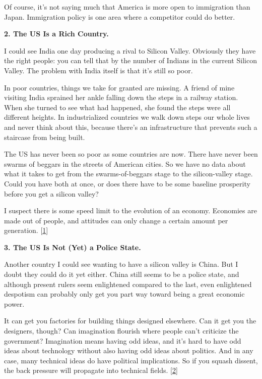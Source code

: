 Of course, it's not saying much that
                  America is more open to immigration than Japan. Immigration
                  policy is one area where a competitor could do better.

\textbf{2. The US Is a Rich Country.}

I could see India one day producing a rival to
                  Silicon Valley. Obviously they have the right people: you can
                  tell that by the number of Indians in the current Silicon
                  Valley. The problem with India itself is that it's still so
                  poor.

In poor countries, things we take for granted
                  are missing. A friend of mine visiting India sprained her
                  ankle falling down the steps in a railway station. When she
                  turned to see what had happened, she found the steps were all
                  different heights. In industrialized countries we walk down
                  steps our whole lives and never think about this, because
                  there's an infrastructure that prevents such a staircase from
                  being built.

The US has never been so poor as some
                  countries are now. There have never been swarms of beggars in
                  the streets of American cities. So we have no data about what
                  it takes to get from the swarms-of-beggars stage to the
                  silicon-valley stage. Could you have both at once, or does
                  there have to be some baseline prosperity before you get a
                  silicon valley?

I suspect there is some speed limit
                  to the evolution of an economy. Economies are made out of
                  people, and attitudes can only change a certain amount per
                  generation.
                  [\href{\#f1n}{1}]

\textbf{3. The US Is Not (Yet) a Police State.}

Another country I could see wanting to have a
                  silicon valley is China. But I doubt they could do it yet
                  either. China still seems to be a police state, and although
                  present rulers seem enlightened compared to the last, even
                  enlightened despotism can probably only get you part way
                  toward being a great economic power.

It can get you
                  factories for building things designed elsewhere. Can it get
                  you the designers, though? Can imagination flourish where
                  people can't criticize the government? Imagination means
                  having odd ideas, and it's hard to have odd ideas about
                  technology without also having odd ideas about politics. And
                  in any case, many technical ideas do have political
                  implications. So if you squash dissent, the back pressure will
                  propagate into technical fields.
                  [\href{\#f2n}{2}]

